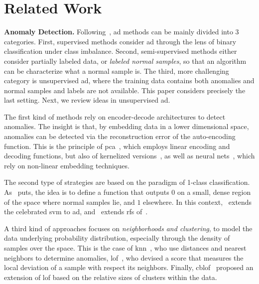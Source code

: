 \section{Related Work}\label{sec:related_work}

\noindent\textbf{Anomaly Detection.} Following~\cite{han2022adbench}, \gls{ad} methods can be mainly divided into 3 categories. First, supervised methods consider \gls{ad} through the lens of binary classification under class imbalance. Second, semi-supervised methods either consider partially labeled data, or \emph{labeled normal samples}, so that an algorithm can be characterize what a normal sample is. The third, more challenging category is unsupervised \gls{ad}, where the training data contains both anomalies and normal samples and labels are not available. This paper considers precisely the last setting. Next, we review ideas in unsupervised \gls{ad}.

The first kind of methods rely on encoder-decode architectures to detect anomalies. The insight is that, by embedding data in a lower dimensional space, anomalies can be detected via the reconstruction error of the auto-encoding function. This is the principle of \gls{pca}~\cite{shyu2003novel}, which employs linear encoding and decoding functions, but also of kernelized versions~\cite{scholkopf1997kernel,hoffmann2007kernel}, as well as neural nets~\cite{vincent2008extracting,bengio2013representation}, which rely on non-linear embedding techniques.

The second type of strategies are based on the paradigm of 1-class classification. As~\cite{scholkopf1999support} puts, the idea is to define a function that outputs $0$ on a small, dense region of the space where normal samples lie, and $1$ elsewhere. In this context,~\cite{scholkopf1997kernel} extends the celebrated \gls{svm} to \gls{ad}, and~\cite{liu2008isolation} extends \glspl{rf} of~\cite{breiman2001random}.

A third kind of approaches focuses on \emph{neighborhoods and clustering}, to model the data underlying probability distribution, especially through the density of samples over the space. This is the case of \gls{knn}~\citep{ramaswamy2000efficient}, who use distances and nearest neighbors to determine anomalies, \gls{lof}~\cite{breunig2000lof}, who devised a score that measures the local deviation of a sample with respect its neighbors. Finally, \gls{cblof}~\cite{he2003discovering} proposed an extension of \gls{lof} based on the relative sizes of clusters within the data.

